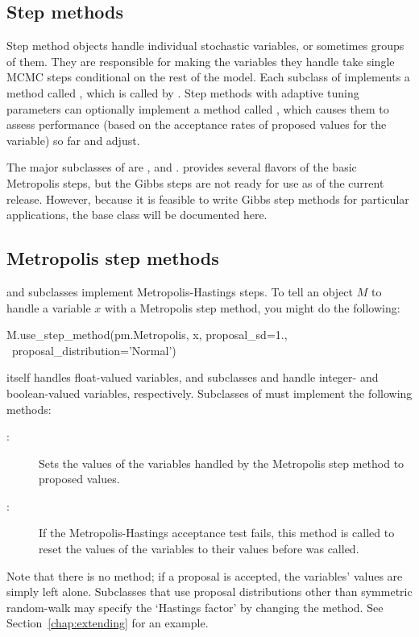 \documentclass[]{jss}
\begin{document}
\subsection{Step methods} \label{sec:stepmethod}


Step method objects handle individual stochastic variables, or sometimes groups of them. They are responsible for making the variables they handle take single MCMC steps conditional on the rest of the model. Each subclass of  implements a method called , which is called by . Step methods with adaptive tuning parameters can optionally implement a method called , which causes them to assess performance (based on the acceptance rates of proposed values for the variable) so far and adjust.

The major subclasses of  are ,
 and .  provides several flavors of the
basic Metropolis steps, but the Gibbs steps are not ready for use as of the
current release. However, because it is feasible to write Gibbs step methods
for particular applications, the  base class will be documented
here.

\subsection{Metropolis step methods} \label{metropolis}

 and subclasses implement Metropolis-Hastings steps. To tell an  object $M$ to handle a variable $x$ with a Metropolis step method, you might do the following:
\begin{CodeInput}
M.use_step_method(pm.Metropolis, x, proposal_sd=1., \ 
    proposal_distribution='Normal')
\end{CodeInput}

 itself handles float-valued variables, and subclasses  and  handle integer- and boolean-valued variables, respectively. Subclasses of  must implement the following methods:
\begin{description}
    \item[:] Sets the values of the variables handled by the Metropolis step method to proposed values.
    \item[\code{reject()}:] If the Metropolis-Hastings acceptance test fails, this method is called to reset the values of the variables to their values before  was called.
\end{description}
Note that there is no  method; if a proposal is accepted, the variables' values are simply left alone. Subclasses that use proposal distributions other than symmetric random-walk may specify the `Hastings factor' by changing the  method. See Section~\ref{chap:extending} for an example.
\end{document}
